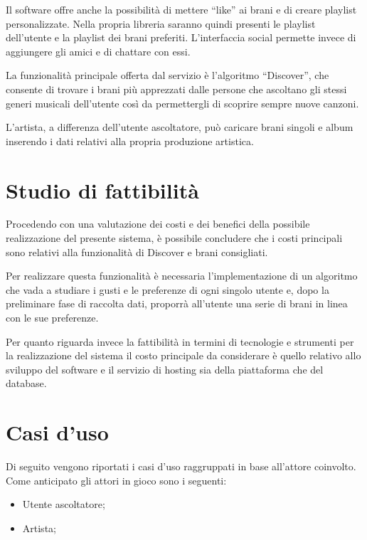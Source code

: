Il software offre anche la possibilità di mettere ``like'' ai brani e di creare playlist
personalizzate. Nella propria libreria saranno quindi presenti le playlist dell'utente e
la playlist dei brani preferiti. L'interfaccia social permette invece di aggiungere gli
amici e di chattare con essi.

La funzionalità principale offerta dal servizio è l'algoritmo ``Discover'', che consente
di trovare i brani più apprezzati dalle persone che ascoltano gli stessi generi musicali
dell'utente così da permettergli di scoprire sempre nuove canzoni.

L'artista, a differenza dell'utente ascoltatore, può caricare brani singoli e album
inserendo i dati relativi alla propria produzione artistica.


\vspace{1cm}
\section{Studio di fattibilità}
Procedendo con una valutazione dei costi e dei benefici della possibile realizzazione del
presente sistema, è possibile concludere che i costi principali sono relativi alla
funzionalità di Discover e brani consigliati. 

Per realizzare questa funzionalità è
necessaria l'implementazione di un algoritmo che vada a studiare i gusti e le preferenze
di ogni singolo utente e, dopo la preliminare fase di raccolta dati, proporrà all'utente
una serie di brani in linea con le sue preferenze. 

Per quanto riguarda invece la
fattibilità in termini di tecnologie e strumenti per la realizzazione del sistema 
il costo principale da considerare è quello relativo allo sviluppo del software e il servizio di hosting sia 
della piattaforma che del database. 


\newpage
\section{Casi d'uso}
Di seguito vengono riportati i casi d'uso raggruppati in base all'attore coinvolto. Come
anticipato gli attori in gioco sono i seguenti:
\begin{itemize}
      \item Utente ascoltatore;
      \item Artista;
\end{itemize}

